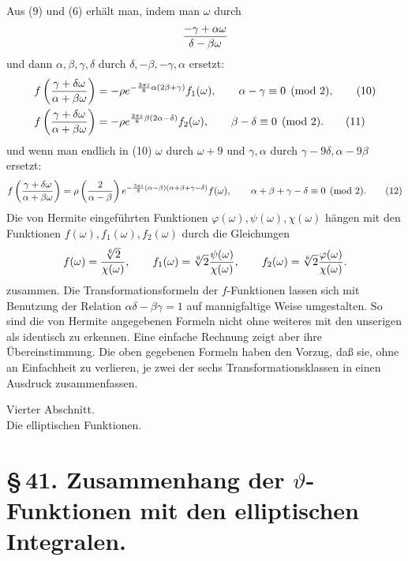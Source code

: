 \documentclass[11pt]{article}
\newcommand{\Jac}[2]{\left(\frac{#1}{#2}\right)}
\begin{document}
Aus (9) und (6) erhält man, indem man $\omega$ durch
\[
{-\gamma+
\alpha\omega\over\delta-
\beta\omega}
\]
und dann $\alpha,\beta,\gamma,\delta$ durch $\delta,-\beta,-\gamma,\alpha$ ersetzt:
\begin{align}
f\left({\gamma+
\delta\omega\over\alpha+
\beta\omega}\right)
&=-\rho e^{-\frac{3\pi i}{8}\alpha(2\beta+
\gamma)}f_1(\omega),
\qquad \alpha-
\gamma\equiv0\pmod2, \tag{10}\\
f\left({\gamma+
\delta\omega\over\alpha+
\beta\omega}\right)
&=-\rho e^{\frac{3\pi i}{8}\beta(2\alpha-
\delta)}f_2(\omega),
\qquad \beta-
\delta\equiv0\pmod2. \tag{11}
\end{align}
und wenn man endlich in (10) $\omega$ durch $\omega+9$ und $\gamma,
\alpha$ durch $\gamma-9\delta,
\alpha-9\beta$ ersetzt:
\begin{equation}
f\left({\gamma+
\delta\omega\over\alpha+
\beta\omega}\right)
=\rho\Jac{2}{\alpha-
\beta}e^{-\frac{3\pi i}{8}(\alpha-
\beta)(\alpha+
\beta+
\gamma-
\delta)}f(\omega),
\qquad \alpha+
\beta+
\gamma-
\delta\equiv0\pmod2. 
\tag{12}
\end{equation}
Die von Hermite eingeführten Funktionen $\varphi(\omega),\psi(\omega),\chi(\omega)$ hängen mit den Funktionen $f(\omega),f_1(\omega),f_2(\omega)$ durch die Gleichungen
\[
f(\omega)={\sqrt[6]{2}\over\chi(\omega)},
\qquad
f_1(\omega)=\sqrt[6]{2}{\psi(\omega)\over\chi(\omega)},
\qquad
f_2(\omega)=\sqrt[6]{2}{\varphi(\omega)\over\chi(\omega)}.
\]
zusammen. Die Transformationsformeln der $f$-Funktionen lassen sich mit Benutzung der Relation $\alpha\delta-\beta\gamma=1$ auf mannigfaltige Weise umgestalten. So sind die von Hermite angegebenen Formeln nicht ohne weiteres mit den unserigen als identisch zu erkennen. Eine einfache Rechnung zeigt aber ihre Übereinstimmung. Die oben gegebenen Formeln haben den Vorzug, daß sie, ohne an Einfachheit zu verlieren, je zwei der sechs Transformationsklassen in einen Ausdruck zusammenfassen.

\begin{center}
{\large Vierter Abschnitt.}\\[0.7em]
{\Large Die elliptischen Funktionen.}
\end{center}

\section*{\S\,41. Zusammenhang der $\vartheta$-Funktionen mit den elliptischen Integralen.}
\end{document}
